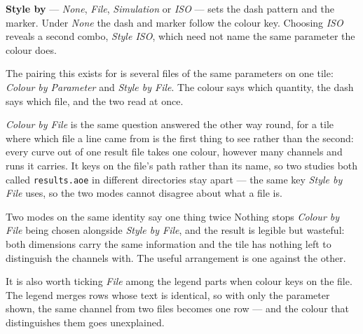 \documentclass[11pt,a4paper,oneside]{report}
\newcommand{\code}[1]{\texttt{#1}}
\begin{document}
\textbf{Style by} --- \emph{None}, \emph{File}, \emph{Simulation} or \emph{ISO}
--- sets the dash pattern and the marker. Under \emph{None} the dash and marker
follow the colour key. Choosing \emph{ISO} reveals a second
combo, \emph{Style ISO}, which need not name the same parameter the colour does.

The pairing this exists for is several files of the same parameters on one tile:
\emph{Colour by Parameter} and \emph{Style by File}. The colour says which
quantity, the dash says which file, and the two read at once.

\emph{Colour by File} is the same question answered the other way round, for a
tile where which file a line came from is the first thing to see rather than
the second: every curve out of one result file takes one colour, however many
channels and runs it carries. It keys on the file's path rather than its name,
so two studies both called \code{results.aoe} in different directories stay
apart --- the same key \emph{Style by File} uses, so the two modes cannot
disagree about what a file is.

\begin{aoenote}{Two modes on the same identity say one thing twice}
Nothing stops \emph{Colour by File} being chosen alongside \emph{Style by
File}, and the result is legible but wasteful: both dimensions carry the same
information and the tile has nothing left to distinguish the channels with.
The useful arrangement is one against the other.

It is also worth ticking \emph{File} among the legend parts when colour keys
on the file. The legend merges rows whose text is identical, so with only the
parameter shown, the same channel from two files becomes one row --- and the
colour that distinguishes them goes unexplained.
\end{aoenote}
\end{document}
